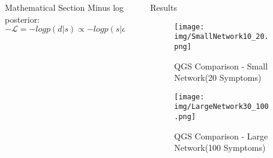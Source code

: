 \documentclass[final]{beamer}
\newlength{\sepwid}
\newlength{\onecolwid}
\newlength{\twocolwid}
\begin{document}
\begin{frame}
\begin{columns}[t]
\begin{column}{\twocolwid}
\begin{columns}[t,totalwidth=\twocolwid]
\begin{column}{\onecolwid}
\begin{exampleblock}{Mathematical Section}
Minus log posterior: 
\begin{equation*}
-\mathcal{L}=-logp(d|s) \propto -logp(s|d)+log(1/p(d))
\label{eqn:Minus log of posterior}
\end{equation*}





\end{exampleblock}


\end{column} %
\begin{column}{\sepwid}\end{column} %

\begin{column}{\onecolwid} %


\begin{exampleblock}{Results}

\begin{figure}
\texttt{[image: img/SmallNetwork10\_20.png]}
\caption{QGS Comparison - Small Network(20 Symptoms)}
\end{figure}

\vspace{2cm}
\begin{figure}
\texttt{[image: img/LargeNetwork30\_100.png]}
\caption{QGS Comparison - Large Network(100 Symptoms)}
\end{figure}

\end{exampleblock}


\end{column} %

\end{columns} %

\end{column} %

\begin{column}{\sepwid}\end{column} %


\end{columns}
\end{frame}
\end{document}
